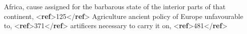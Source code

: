 \begin{shaded}
\hspace*{1em}\hspace*{1em}Africa, cause assigned for the barbarous state of\mbox{}\newline 
\hspace*{1em}\hspace*{1em}\hspace*{1em}\hspace*{1em}\hspace*{1em}\hspace*{1em} the interior parts of that continent, {<\textbf{ref}>}125{</\textbf{ref}>}\mbox{}\newline 
\hspace*{1em}\hspace*{1em}\mbox{}\newline 
\hspace*{1em}\hspace*{1em}Agriculture\mbox{}\newline 
\hspace*{1em}\hspace*{1em}\mbox{}\newline 
\hspace*{1em}\hspace*{1em}\hspace*{1em}\hspace*{1em}ancient policy of Europe unfavourable to, {<\textbf{ref}>}371{</\textbf{ref}>}\mbox{}\newline 
\hspace*{1em}\hspace*{1em}\hspace*{1em}\hspace*{1em}\mbox{}\newline 
\hspace*{1em}\hspace*{1em}\hspace*{1em}\hspace*{1em}artificers necessary to carry it on, {<\textbf{ref}>}481{</\textbf{ref}>}\mbox{}\newline 

\end{shaded}

